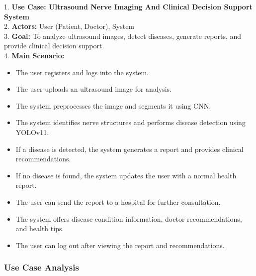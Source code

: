 \documentclass[12pt]{article}
\numberwithin{figure}{subsection}
\begin{document}
1. \textbf{Use Case: Ultrasound Nerve Imaging And Clinical Decision Support System}  \vspace{5pt}\\  
2. \textbf{Actors:} User (Patient, Doctor), System  \vspace{5pt} \\  
3. \textbf{Goal:} To analyze ultrasound images, detect diseases, generate reports, and provide clinical decision support. \vspace{5pt} \\  
4. \textbf{Main Scenario:}  
\begin{itemize}  
    \item The user registers and logs into the system.  
    \item The user uploads an ultrasound image for analysis.  
    \item The system preprocesses the image and segments it using CNN.  
    \item The system identifies nerve structures and performs disease detection using YOLOv11.  
    \item If a disease is detected, the system generates a report and provides clinical recommendations.  
    \item If no disease is found, the system updates the user with a normal health report.  
    \item The user can send the report to a hospital for further consultation.  
    \item The system offers disease condition information, doctor recommendations, and health tips.  
    \item The user can log out after viewing the report and recommendations.  
\end{itemize}  

\newpage
\subsubsection{Use Case Analysis}
\end{document}
